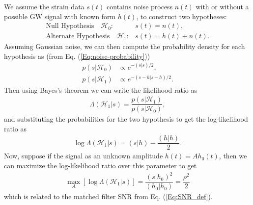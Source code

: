 We assume the strain data $s(t)$ contains noise process $n(t)$ with or without a possible GW signal with known form $h(t)$, to construct two hypotheses:
\begin{align}
    \text{Null Hypothesis} \hspace{1em} \mathcal{H}_0 :  & s(t) = n(t), \\
    \text{Alternate Hypothesis} \hspace{1em} \mathcal{H}_1 : & s(t) = h(t) + n(t).
\end{align}
Assuming Gaussian noise, we can then compute the probability density for each hypothesis as (from Eq. (\ref{Eq:noise-probability}))
\begin{align}
    p(s|\mathcal{H}_0) & \propto e^{-(s|s)/2},\\
    p(s|\mathcal{H}_1) & \propto e^{-(s-h|s-h)/2}.
\end{align}
Then using Bayes's theorem we can write the likelihood ratio as
\begin{align}
    \Lambda(\mathcal{H}_1|s) = \dfrac{p(s|\mathcal{H}_1)}{p(s|\mathcal{H}_0)},
\end{align}
and substituting the probabilities for the two hypothesis to get the log-likelihood ratio as
\begin{align}
    \log\Lambda(\mathcal{H}_1|s) = (s|h) - \dfrac{(h|h)}{2}.
\end{align}
Now, suppose if the signal as an unknown amplitude $h(t) = Ah_0(t)$, then we can maximize the log-likelihood ratio over this parameter to get
\begin{align}
    \max_{A} [\log\Lambda(\mathcal{H}_1|s)] = \dfrac{(s|h_0)^2}{(h_0|h_0)} = \dfrac{\rho^2}{2}
\end{align}
which is related to the matched filter SNR from Eq. (\ref{Eq:SNR_def}).




